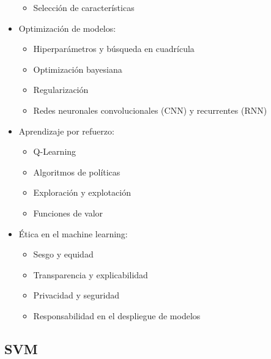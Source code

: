 \documentclass{article}
\begin{document}
\begin{itemize}
\begin{itemize}
            \item Selección de características
        \end{itemize}
    \item Optimización de modelos:
        \begin{itemize}
            \item Hiperparámetros y búsqueda en cuadrícula
            \item Optimización bayesiana
            \item Regularización
            \item Redes neuronales convolucionales (CNN) y recurrentes (RNN)
        \end{itemize}
    \item Aprendizaje por refuerzo:
        \begin{itemize}
            \item Q-Learning
            \item Algoritmos de políticas
            \item Exploración y explotación
            \item Funciones de valor
        \end{itemize}
    \item Ética en el machine learning:
        \begin{itemize}
            \item Sesgo y equidad
            \item Transparencia y explicabilidad
            \item Privacidad y seguridad
            \item Responsabilidad en el despliegue de modelos
        \end{itemize}
\end{itemize}


\subsection{SVM}
\end{document}

